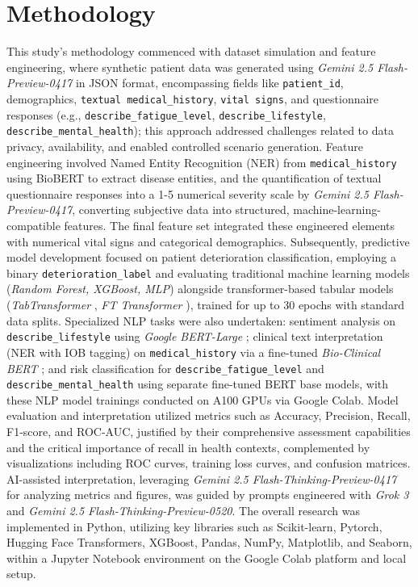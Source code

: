 \section{Methodology}

This study's methodology commenced with dataset simulation and feature engineering, where synthetic patient data was generated using \textit{Gemini 2.5 Flash-Preview-0417} \parencite{Doshi_2025} in JSON format, encompassing fields like \texttt{patient\_id}, demographics, \texttt{textual medical\_history}, \texttt{vital signs}, and questionnaire responses (e.g., \texttt{describe\_fatigue\_level}, \texttt{describe\_lifestyle}, \texttt{describe\_mental\_health}); this approach addressed challenges related to data privacy, availability, and enabled controlled scenario generation. Feature engineering involved Named Entity Recognition (NER) from \texttt{medical\_history} using BioBERT \parencite{Lee_2019} to extract disease entities, and the quantification of textual questionnaire responses into a 1-5 numerical severity scale by \textit{Gemini 2.5 Flash-Preview-0417}, converting subjective data into structured, machine-learning-compatible features. The final feature set integrated these engineered elements with numerical vital signs and categorical demographics. Subsequently, predictive model development focused on patient deterioration classification, employing a binary \texttt{deterioration\_label} and evaluating traditional machine learning models (\textit{Random Forest, XGBoost, MLP}) alongside transformer-based tabular models (\textit{TabTransformer} \parencite{huang2020tabtransformertabulardatamodeling}, \textit{FT Transformer} \parencite{gorishniy2023revisitingdeeplearningmodels}), trained for up to 30 epochs with standard data splits. Specialized NLP tasks were also undertaken: sentiment analysis on \texttt{describe\_lifestyle} using \textit{Google BERT-Large} \parencite{devlin2019bertpretrainingdeepbidirectional}; clinical text interpretation (NER with IOB tagging) on \texttt{medical\_history} via a fine-tuned \textit{Bio-Clinical BERT} \parencite{ling2023bioclinicalbertbertbase}; and risk classification for \texttt{describe\_fatigue\_level} and \texttt{describe\_mental\_health} using separate fine-tuned BERT base models, with these NLP model trainings conducted on A100 GPUs via Google Colab. Model evaluation and interpretation utilized metrics such as Accuracy, Precision, Recall, F1-score, and ROC-AUC, justified by their comprehensive assessment capabilities and the critical importance of recall in health contexts, complemented by visualizations including ROC curves, training loss curves, and confusion matrices. AI-assisted interpretation, leveraging \textit{Gemini 2.5 Flash-Thinking-Preview-0417} for analyzing metrics and figures, was guided by prompts engineered with \textit{Grok 3} \parencite{xGrokBeta} and \textit{Gemini 2.5 Flash-Thinking-Preview-0520}. The overall research was implemented in Python, utilizing key libraries such as Scikit-learn, Pytorch, Hugging Face Transformers, XGBoost, Pandas, NumPy, Matplotlib, and Seaborn, within a Jupyter Notebook environment on the Google Colab platform and local setup.